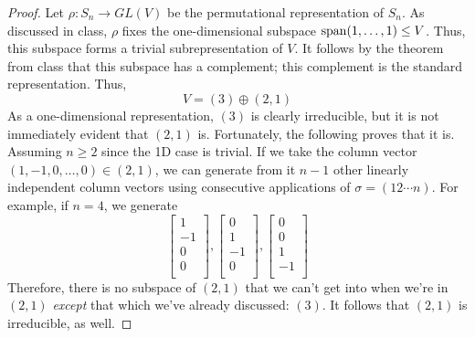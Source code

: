\documentclass[../psets.tex]{subfiles}
\begin{document}
\begin{enumerate}
\begin{proof}


        Let $\rho:S_n\to GL(V)$ be the permutational representation of $S_n$. As discussed in class, $\rho$ fixes the one-dimensional subspace $\operatorname{span}(1,\dots,1)\leq V$. Thus, this subspace forms a trivial subrepresentation of $V$. It follows by the theorem from class that this subspace has a complement; this complement is the standard representation. Thus,
        \begin{equation*}
            V = (3)\oplus(2,1)
        \end{equation*}
        As a one-dimensional representation, $(3)$ is clearly irreducible, but it is not immediately evident that $(2,1)$ is. Fortunately, the following proves that it is. Assuming $n\geq 2$ since the 1D case is trivial. If we take the column vector $(1,-1,0,\dots,0)\in(2,1)$, we can generate from it $n-1$ other linearly independent column vectors using consecutive applications of $\sigma=(12\cdots n)$. For example, if $n=4$, we generate
        \begin{equation*}
            \begin{bmatrix}
                1\\
                -1\\
                0\\
                0\\
            \end{bmatrix},
            \begin{bmatrix}
                0\\
                1\\
                -1\\
                0\\
            \end{bmatrix},
            \begin{bmatrix}
                0\\
                0\\
                1\\
                -1\\
            \end{bmatrix}
        \end{equation*}
        Therefore, there is no subspace of $(2,1)$ that we can't get into when we're in $(2,1)$ \emph{except} that which we've already discussed: $(3)$. It follows that $(2,1)$ is irreducible, as well.

\end{proof}
\end{enumerate}
\end{document}
